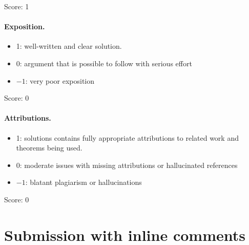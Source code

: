 \documentclass[11pt]{article}
\theoremstyle{remark}
\begin{document}
\noindent Score: 1

\paragraph{Exposition.}
\begin{itemize}
	\item  1: well-written and clear solution.
	\item  0: argument that is possible to follow with serious effort
	\item  $-1$: very poor exposition
\end{itemize}

\noindent Score: 0

\paragraph{Attributions.}
\begin{itemize}
	\item  1: solutions contains fully appropriate attributions
		to related work and theorems being used.
	\item  0: moderate issues with missing attributions or hallucinated references
	\item  $-1$: blatant plagiarism or hallucinations
\end{itemize}

\noindent Score: 0

\newpage
\section{Submission with inline comments}


\begin{abstract}
Let a quadratic rational map have a critical point of exact period four, with its other critical value outside that cycle. Mark the cycle and the additional critical value. We describe a simple closed curve whose squared Dehn twist preserves the associated Teichm\"uller deformation space and has an infinite orbit on its connected components. After normalizing the cycle to $0,\infty,1,t$, the curve is obtained by transporting an upper semicircle from the parameter $t=3$. An explicit finite covering of ordered moduli identifies the stabilizer of the component containing the rational structure. A winding number on a further three-sheeted covering vanishes on this stabilizer and is nonzero on the squared twist. The construction applies to every admissible complex parameter.
\end{abstract}
\end{document}
